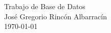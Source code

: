 \thispagestyle{empty}
\begin{titlepage}
    \vspace*{\fill}
    \begin{center}
      \Huge{Trabajo de Base de Datos}\\[0.5cm]
      \large{José Gregorio Rincón Albarracín}\\[0.4cm]
      \small{\today}
    \end{center}
    \vspace*{\fill}
\end{titlepage}